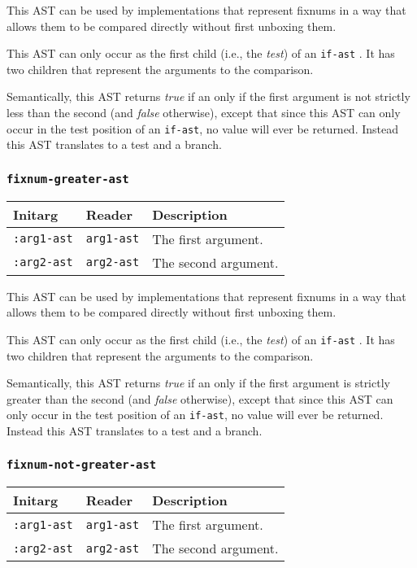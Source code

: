 This AST can be used by implementations that represent fixnums in a
way that allows them to be compared directly without first unboxing
them.

This AST can only occur as the first child (i.e., the \emph{test}) of
an \texttt{if-ast} .  It has two children that
represent the arguments to the comparison.

Semantically, this AST returns \emph{true} if an only if the first
argument is not strictly less than the second (and \emph{false}
otherwise), except that since this AST can only occur in the test
position of an \texttt{if-ast}, no value will ever be returned.
Instead this AST translates to a test and a branch.

\subsubsection{\texttt{fixnum-greater-ast}}
\label{fixnum-greater-ast}

\begin{tabular}{|l|l|l|}
\hline
Initarg & Reader & Description\\
\hline\hline
\texttt{:arg1-ast} & \texttt{arg1-ast} & The first argument.\\
\hline
\texttt{:arg2-ast} & \texttt{arg2-ast} & The second argument.\\
\hline
\end{tabular}

This AST can be used by implementations that represent fixnums in a
way that allows them to be compared directly without first unboxing
them.

This AST can only occur as the first child (i.e., the \emph{test}) of
an \texttt{if-ast} .  It has two children that
represent the arguments to the comparison.

Semantically, this AST returns \emph{true} if an only if the first
argument is strictly greater than the second (and \emph{false}
otherwise), except that since this AST can only occur in the test
position of an \texttt{if-ast}, no value will ever be returned.
Instead this AST translates to a test and a branch.

\subsubsection{\texttt{fixnum-not-greater-ast}}
\label{fixnum-not-greater-ast}

\begin{tabular}{|l|l|l|}
\hline
Initarg & Reader & Description\\
\hline\hline
\texttt{:arg1-ast} & \texttt{arg1-ast} & The first argument.\\
\hline
\texttt{:arg2-ast} & \texttt{arg2-ast} & The second argument.\\
\hline
\end{tabular}

